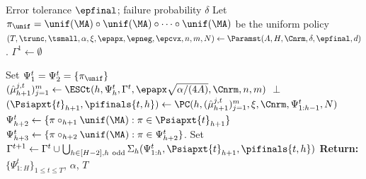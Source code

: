 \documentclass[11pt, oneside]{article}
\theoremstyle{plain}
\theoremstyle{definition}
\numberwithin{theorem}{section}
\renewcommand{\^}[1]{^{(#1)}}
\begin{document}
\begin{algorithm}
	\caption{$\SLMt(\epfinal, \delta)$: Explore $\ell_1$-Bounded Linear MDP}
	\label{alg:slm-trunc}
	\begin{algorithmic}[1]\onehalfspacing
		\Require Error tolerance $\epfinal$; failure probability $\delta$
		\State Let $\pi_\unif = \unif(\MA) \circ \unif(\MA) \circ \dots \circ \unif(\MA)$ be the uniform policy
        \State $(T, \trunc, \tsmall, \alpha, \xi, \epapx, \epneg, \epcvx, n,m,N) \gets \Paramst(A, H, \Cnrm, \delta, \epfinal, d)$ \label{line:mess}.
                \State $\Gamma^1 \gets \emptyset$
        
        \State Set $\Psi_1^t = \Psi_2^t = \{\pi_\unif\}$
            \State $(\hat\mu_{h+1}^{j,t})_{j=1}^m \gets \ESCt(h,\Psi_h^t,\Gamma^t,\epapx\sqrt{\alpha/(4A)},\Cnrm,n,m)$ \label{line:trunc-emulator}
            \Statex{}
            \State \Return $\perp$ 
            \EndIf
            \State $(\Psiapxt{t}_{h+1}, \pifinals{t,h}) \gets \PC(h,(\hat\mu_{h+1}^{j,t})_{j=1}^m,\xi,\Cnrm,\Psi_{1:h-1}^t,N)$ \label{line:trunc-greedycover}
            \State $\Psi_{h+2}^t \gets \{\pi \circ_{h+1} \unif(\MA): \pi \in \Psiapxt{t}_{h+1}\}$ \label{line:odd-psi}
            \State $\Psi_{h+3}^t \gets  \{\pi \circ_{h+2} \unif(\MA): \pi \in \Psi_{h+2}^t\}$.\label{line:even-psi} %
            \EndFor
            \State Set $\Gamma^{t+1} \gets \Gamma^t \cup \bigcup_{h\in [H-2], h \ \mathrm{ odd}} \Sigma_h(\Psi_{1:h}^t, \Psiapxt{t}_{h+1}, \pifinals{t,h})$  \label{line:append-gammat}
         \EndFor
        \State \textbf{Return:} $\{\Psi_{1:H}^t\}_{1 \leq t \leq T}$, $\alpha$, $T$
	\end{algorithmic}
  \end{algorithm}
\end{document}
